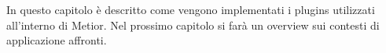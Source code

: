 In questo capitolo \`e descritto come vengono implementati i plugins utilizzati all'interno di Metior.
Nel prossimo capitolo si farà un overview sui contesti di applicazione affronti.

